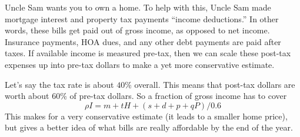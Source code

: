 \documentclass{article}
\begin{document}
Uncle Sam wants you to own a home. To help with this, Uncle Sam 
made mortgage interest and property tax payments 
``income deductions.'' In other words, these bills get paid out 
of gross income, as opposed to net income. 
Insurance payments, HOA dues, and any other debt payments 
are paid after taxes. If available income is 
measured pre-tax, then we can scale these post-tax expenses up 
into pre-tax dollars to make a yet more conservative estimate.

Let's say the tax rate is about $40$\% overall. This means that 
post-tax dollars are worth about $60$\% of pre-tax dollars.
So a fraction of gross income has to cover
\begin{equation}
\label{AvailableIncomePostTax}
\rho I = m + tH + (s + d + p + qP) / 0.6
\end{equation}
This makes for a very conservative estimate (it 
leads to a smaller home price), but gives a better idea of what 
bills are really affordable by the end of the year.

\pagebreak
\end{document}
